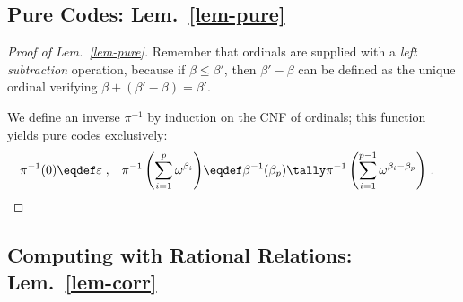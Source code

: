 \subsection{Pure Codes: Lem.~\ref{lem-pure}}\label{app-pure}
\begin{proof}[Proof of Lem.~\ref{lem-pure}]
  Remember that ordinals are supplied with a \emph{left
  subtraction} operation, because if $\beta\leq \beta'$, then
  $\beta'-\beta$ can be defined as the unique ordinal verifying
  $\beta+(\beta'-\beta)=\beta'$.

  We define an inverse $\pi^{-1}$ by induction on the CNF of ordinals;
  this function yields pure codes exclusively:
  \begin{align}
    \pi^{-1}(0)&\eqdef \varepsilon\;,
  & \pi^{-1}\left(\sum_{i=1}^p\omega^{\beta_i}\right)&\eqdef \beta^{-1}(\beta_p)\tally\pi^{-1}\left(\sum_{i=1}^{p-1}\omega^{\beta_i-\beta_p}\right)\,.
  \qedhere
  \end{align}
\end{proof}



\subsection{Computing with Rational Relations:
  Lem.~\ref{lem-corr}}\label{ax-rules}

